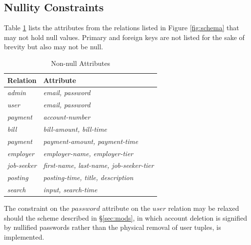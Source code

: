 \documentclass{article}
\begin{document}
            \subsection{Nullity Constraints}
                Table \ref{tab:non_null} lists the attributes from the relations listed in Figure \ref{fig:schema} that
                may not hold null values. Primary and foreign keys are not listed for the sake of brevity but also may
                not be null. \par
                \begin{table}[h]
                    \centering
                    \begin{tabular}{|l|l|}
                        \hline
                        \textbf{Relation}   & \textbf{Attribute}                              \\ \hline
                        \textit{admin}      & \textit{email, password}                        \\ \hline
                        \textit{user}       & \textit{email, password}                        \\ \hline
                        \textit{payment}    & \textit{account-number}                         \\ \hline
                        \textit{bill}       & \textit{bill-amount, bill-time}                 \\ \hline
                        \textit{payment}    & \textit{payment-amount, payment-time}           \\ \hline
                        \textit{employer}   & \textit{employer-name, employer-tier}           \\ \hline
                        \textit{job-seeker} & \textit{first-name, last-name, job-seeker-tier} \\ \hline
                        \textit{posting}    & \textit{posting-time, title, description}       \\ \hline
                        \textit{search}     & \textit{input, search-time}                     \\ \hline
                    \end{tabular}
                    \caption{Non-null Attributes}
                    \label{tab:non_null}
                \end{table}
                The constraint on the $password$ attribute on the $user$ relation may be relaxed should the scheme
                described in \S \ref{sec:mods}, in which account deletion is signified by nullified passwords rather
                than the physical removal of user tuples, is implemented.
\end{document}
